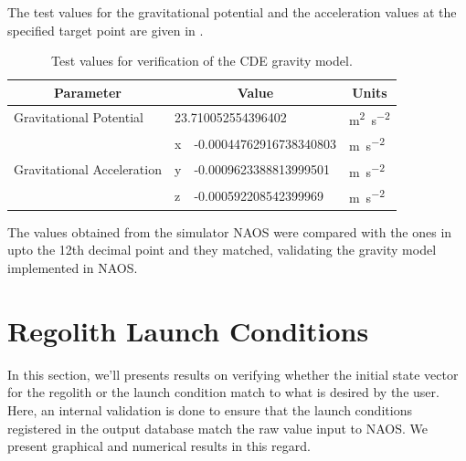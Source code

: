 \FloatBarrier
The test values for the gravitational potential and the acceleration values at the specified target point are given in .
\begin{table}[htb]
\centering
\captionsetup{justification=centering}
\caption{Test values for verification of the \gls{CDE} gravity model.}
\label{tab:gravity_vv_test_values}
\begin{tabular}{|l|l|l|l|}
\hline
\multicolumn{1}{|c|}{\textbf{Parameter}}    & \multicolumn{2}{c|}{\textbf{Value}}     & \multicolumn{1}{c|}{\textbf{Units}}          \\ \hline
Gravitational Potential                     & \multicolumn{2}{l|}{23.710052554396402} & \si{\metre \squared \per \second \squared} \\ \hline
\multirow{3}{*}{Gravitational Acceleration} & x       & -0.00044762916738340803       & \si{\metre \per \second \squared}          \\ \cline{2-4}
                                            & y       & -0.0009623388813999501        & \si{\metre\per \second \squared}           \\ \cline{2-4}
                                            & z       & -0.000592208542399969         & \si{\metre\per \second \squared}           \\ \hline
\end{tabular}
\end{table}
\FloatBarrier
The values obtained from the simulator \gls{NAOS} were compared with the ones in  upto the 12th decimal point and they matched, validating the gravity model implemented in \gls{NAOS}.

\section{Regolith Launch Conditions}
\label{sec:regolith_launch_conditions_vv}
In this section, we'll presents results on verifying whether the initial state vector for the regolith or the launch condition match to what is desired by the user. Here, an internal validation is done to ensure that the launch conditions registered in the output database match the raw value input to \gls{NAOS}. We present graphical and numerical results in this regard.

